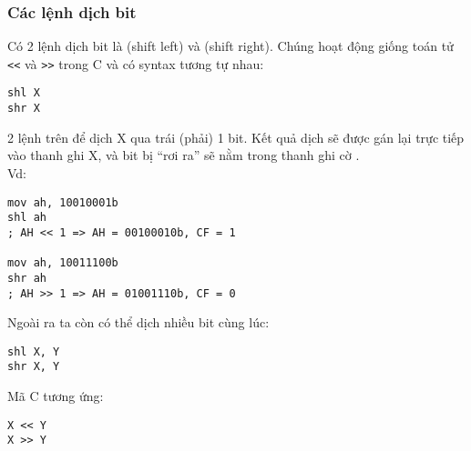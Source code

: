 \documentclass[main.tex]{subfiles}
\begin{document}
\subsubsection{Các lệnh dịch bit}
Có 2 lệnh dịch bit là  (shift left) và  (shift right). Chúng hoạt động giống toán tử \verb#<<# và \verb#>># trong C và có syntax tương tự nhau:
\begin{verbatim}
shl X
shr X
\end{verbatim}
2 lệnh trên để dịch \cd X qua trái (phải) 1 bit. Kết quả dịch sẽ được gán lại trực tiếp vào thanh ghi \cd X, và bit bị ``rơi ra'' sẽ nằm trong thanh ghi cờ .\\
Vd:
\begin{verbatim}
mov ah, 10010001b
shl ah 
; AH << 1 => AH = 00100010b, CF = 1

mov ah, 10011100b
shr ah 
; AH >> 1 => AH = 01001110b, CF = 0
\end{verbatim}
Ngoài ra ta còn có thể dịch nhiều bit cùng lúc:
\begin{verbatim}
shl X, Y 
shr X, Y
\end{verbatim}
Mã C tương ứng:
\begin{verbatim}
X << Y 
X >> Y
\end{verbatim}
\end{document}
